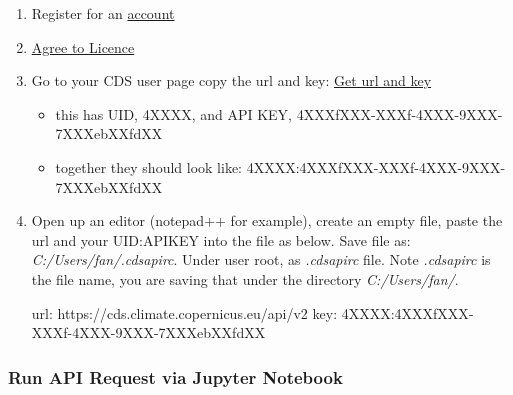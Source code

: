 \documentclass[
]{book}
\newenvironment{Shaded}{\begin{snugshade}}{\end{snugshade}}
\newcommand{\ExtensionTok}[1]{#1}
\newcommand{\NormalTok}[1]{#1}
\providecommand{\tightlist}{%
  \setlength{\itemsep}{0pt}\setlength{\parskip}{0pt}}
\begin{document}
\begin{enumerate}
\def\labelenumi{\arabic{enumi}.}
\item
  Register for an \href{cds.climate.copernicus.eu}{account}
\item
  \href{https://cds.climate.copernicus.eu/cdsapp/\#!/terms/licence-to-use-copernicus-products}{Agree to Licence}
\item
  Go to your CDS user page copy the url and key: \href{https://cds.climate.copernicus.eu/user}{Get url and key}

  \begin{itemize}
  \tightlist
  \item
    this has UID, 4XXXX, and API KEY, 4XXXfXXX-XXXf-4XXX-9XXX-7XXXebXXfdXX
  \item
    together they should look like: 4XXXX:4XXXfXXX-XXXf-4XXX-9XXX-7XXXebXXfdXX
  \end{itemize}
\item
  Open up an editor (notepad++ for example), create an empty file, paste the url and your UID:APIKEY into the file as below. Save file as: \emph{C:/Users/fan/.cdsapirc}. Under user root, as \emph{.cdsapirc} file. Note \emph{.cdsapirc} is the file name, you are saving that under the directory \emph{C:/Users/fan/}.

\begin{Shaded}
\begin{Highlighting}[]
\ExtensionTok{url}\NormalTok{: https://cds.climate.copernicus.eu/api/v2}
\ExtensionTok{key}\NormalTok{: 4XXXX:4XXXfXXX{-}XXXf{-}4XXX{-}9XXX{-}7XXXebXXfdXX}
\end{Highlighting}
\end{Shaded}
\end{enumerate}

\hypertarget{run-api-request-via-jupyter-notebook}{%
\subsubsection{Run API Request via Jupyter Notebook}\label{run-api-request-via-jupyter-notebook}}
\end{document}
